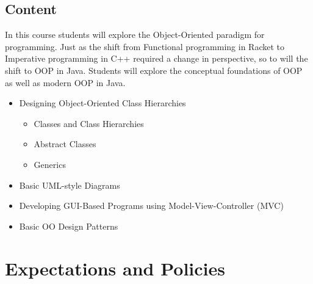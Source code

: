 \documentclass[10pt]{article}
\begin{document}
\subsection{Content}

In this course students will explore the Object-Oriented paradigm for programming. Just as the shift from Functional programming in Racket to Imperative programming in C++ required a change in perspective, so to will the shift to OOP in Java.  Students will explore the conceptual foundations of OOP as well as modern OOP in Java. 

\begin{itemize}
\item Designing Object-Oriented Class Hierarchies
\begin{itemize}
\item Classes and Class Hierarchies 
\item Abstract Classes 
\item Generics
\end{itemize}
\item Basic UML-style Diagrams
\item Developing GUI-Based Programs using Model-View-Controller (MVC)
\item Basic OO Design Patterns
\end{itemize}


\section{Expectations and Policies}
\end{document}
